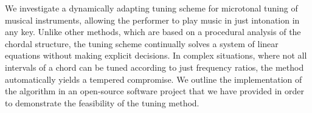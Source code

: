 We investigate a dynamically adapting tuning scheme for microtonal tuning of musical instruments, allowing the performer to play music in just intonation in any key. Unlike other methods, which are based on a procedural analysis of the chordal structure, the tuning scheme continually solves a system of linear equations without making explicit decisions. In complex situations, where not all intervals of a chord can be tuned according to just frequency ratios, the method automatically yields a tempered compromise. We outline the implementation of the algorithm in an open-source software project that we have provided in order to demonstrate the feasibility of the tuning method.
 
